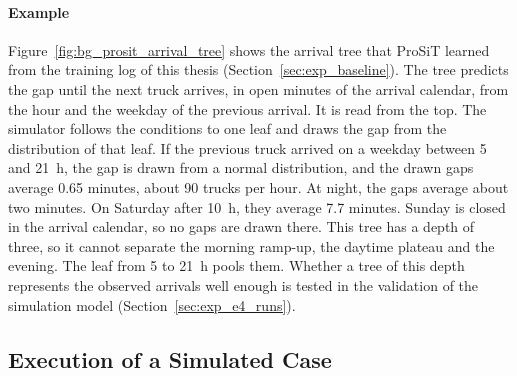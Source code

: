 \paragraph{Example}
Figure~\ref{fig:bg_prosit_arrival_tree} shows the arrival tree that ProSiT
learned from the training log of this thesis (Section~\ref{sec:exp_baseline}).
The tree predicts the gap until the next truck arrives, in open minutes of the
arrival calendar, from the hour and the weekday of the previous arrival. It is
read from the top. The simulator follows the conditions to one leaf and draws the
gap from the distribution of that leaf. If the previous truck arrived on a
weekday between 5 and 21~h, the gap is drawn from a normal distribution, and the
drawn gaps average 0.65 minutes, about 90 trucks per hour. At night, the gaps
average about two minutes. On Saturday after 10~h, they average 7.7 minutes.
Sunday is closed in the arrival calendar, so no gaps are drawn there. This tree
has a depth of three, so it cannot separate the morning ramp-up, the daytime
plateau and the evening. The leaf from 5 to 21~h pools them. Whether a tree of
this depth represents the observed arrivals well enough is tested in the
validation of the simulation model (Section~\ref{sec:exp_e4_runs}).



\subsection{Execution of a Simulated Case}
\label{sec:prosit_execution}

